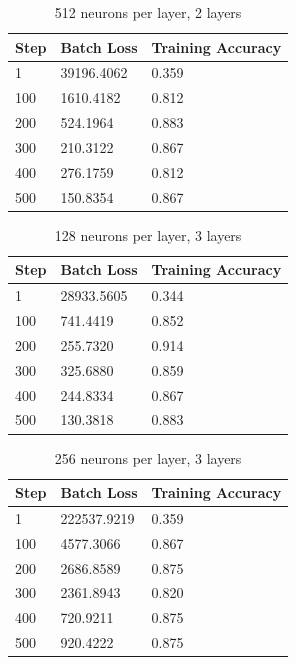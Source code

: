 \documentclass{article}
\begin{document}
\begin{table}[!h]
  \centering
  \begin{tabular}{@{}lll@{}}
  \toprule
  Step  & Batch Loss  & Training Accuracy \\ \midrule
  1     & 39196.4062  & 0.359 \\
  100   & 1610.4182   & 0.812 \\
  200   & 524.1964    & 0.883 \\
  300   & 210.3122    & 0.867 \\
  400   & 276.1759    & 0.812 \\
  500   & 150.8354    & 0.867 \\ \bottomrule
  \end{tabular}
  \caption{512 neurons per layer, 2 layers}
\end{table}

\newpage

\begin{table}[!h]
  \centering
  \begin{tabular}{@{}lll@{}}
  \toprule
  Step  & Batch Loss  & Training Accuracy \\ \midrule
  1     & 28933.5605  & 0.344 \\
  100   & 741.4419    & 0.852 \\
  200   & 255.7320    & 0.914 \\
  300   & 325.6880    & 0.859 \\
  400   & 244.8334    & 0.867 \\
  500   & 130.3818    & 0.883 \\ \bottomrule
  \end{tabular}
  \caption{128 neurons per layer, 3 layers}
\end{table}

\begin{table}[!h]
  \centering
  \begin{tabular}{@{}lll@{}}
  \toprule
  Step  & Batch Loss  & Training Accuracy \\ \midrule
  1     & 222537.9219 & 0.359 \\
  100   & 4577.3066   & 0.867 \\
  200   & 2686.8589   & 0.875 \\
  300   & 2361.8943   & 0.820 \\
  400   & 720.9211    & 0.875 \\
  500   & 920.4222    & 0.875 \\ \bottomrule
  \end{tabular}
  \caption{256 neurons per layer, 3 layers}
\end{table}
\end{document}
